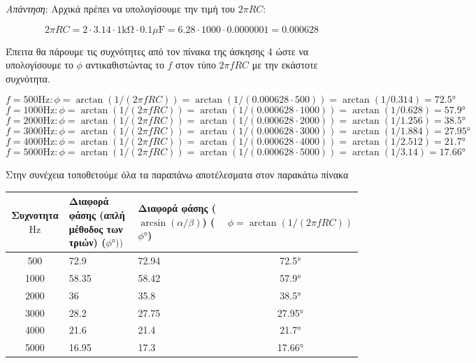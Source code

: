 \documentclass{article}
\begin{document}
\textit{Απάντηση}: Αρχικά πρέπει να υπολογίσουμε την τιμή του $2\pi RC$:

\[2\pi RC = 2 \cdot 3.14 \cdot 1\si{\kohm} \cdot 0.1\si{\mu\farad} =
        6.28 \cdot 1000 \cdot 0.0000001 = 0.000628\]

Έπειτα θα πάρουμε τις συχνότητες από τον πίνακα της άσκησης 4 ώστε να υπολογίσουμε το $\phi$
αντικαθιστώντας το $f$ στον τύπο $2\pi fRC$ με την εκάστοτε συχνότητα.

\[f = 500\si{\hertz}: \phi = \arctan(1 / (2\pi fRC)) = \arctan(1 / (0.000628 \cdot 500)) =
        \arctan(1 / 0.314) = 72.5\si{\degree}\]
\[f = 1000\si{\hertz}: \phi = \arctan(1 / (2\pi fRC)) = \arctan(1 / (0.000628 \cdot 1000)) =
        \arctan(1 / 0.628) = 57.9\si{\degree}\]
\[f = 2000\si{\hertz}: \phi = \arctan(1 / (2\pi fRC)) = \arctan(1 / (0.000628 \cdot 2000)) =
        \arctan(1 / 1.256) = 38.5\si{\degree}\]
\[f = 3000\si{\hertz}: \phi = \arctan(1 / (2\pi fRC)) = \arctan(1 / (0.000628 \cdot 3000)) =
        \arctan(1 / 1.884) = 27.95\si{\degree}\]
\[f = 4000\si{\hertz}: \phi = \arctan(1 / (2\pi fRC)) = \arctan(1 / (0.000628 \cdot 4000)) =
        \arctan(1 / 2.512) = 21.7\si{\degree}\]
\[f = 5000\si{\hertz}: \phi = \arctan(1 / (2\pi fRC)) = \arctan(1 / (0.000628 \cdot 5000)) =
        \arctan(1 / 3.14) = 17.66\si{\degree}\]

Στην συνέχεια τοποθετούμε όλα τα παραπάνω αποτέλεσματα στον παρακάτω πίνακα

\begin{center}
\begin{tabular}{|c|p{30mm}|p{25mm}|c|}
        \hline
        Συχνοτητα $\si{\hertz}$ &
        Διαφορά φάσης (απλή μέθοδος των τριών) ($\si{\phi\degree}))$ &
        Διαφορά φάσης ($\arcsin(α/β)$) ($\si{\phi\degree}$) &
        $\phi = \arctan(1 / (2\pi fRC))$ \\
        \hline
        500 & 72.9 & 72.94 & 72.5\si{\degree} \\
        \hline
        1000 & 58.35 & 58.42 & 57.9\si{\degree} \\
        \hline
        2000 & 36 & 35.8 & 38.5\si{\degree} \\
        \hline
        3000 & 28.2 & 27.75 & 27.95\si{\degree} \\
        \hline
        4000 & 21.6 & 21.4 & 21.7\si{\degree} \\
        \hline
        5000 & 16.95 & 17.3 & 17.66\si{\degree} \\
        \hline
\end{tabular}
\end{center}

\renewcommand\refname{Πηγές}
\end{document}
